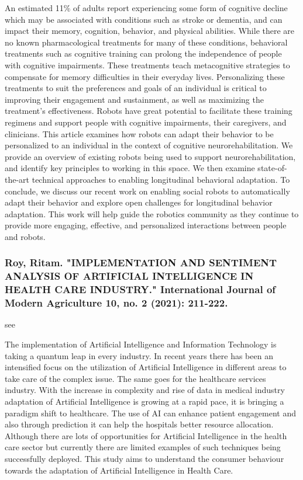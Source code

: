 \documentclass[conference]{IEEEtran}
\begin{document}
An estimated 11\% of adults report experiencing some form of cognitive decline which may be associated with conditions such as stroke or dementia, and can impact their memory, cognition, behavior, and physical abilities. While there are no known pharmacological treatments for many of these conditions, behavioral treatments such as cognitive training can prolong the independence of people with cognitive impairments. These treatments teach metacognitive strategies to compensate for memory difficulties in their everyday lives. Personalizing these treatments to suit the preferences and goals of an individual is critical to improving their engagement and sustainment, as well as maximizing the treatment’s effectiveness. Robots have great potential to facilitate these training regimens and support people with cognitive impairments, their caregivers, and clinicians. This article examines how robots can adapt their behavior to be personalized to an individual in the context of cognitive neurorehabilitation. We provide an overview of existing robots being used to support neurorehabilitation, and identify key principles to working in this space. We then examine state-of-the-art technical approaches to enabling longitudinal behavioral adaptation. To conclude, we discuss our recent work on enabling social robots to automatically adapt their behavior and explore open challenges for longitudinal behavior adaptation. This work will help guide the robotics community as they continue to provide more engaging, effective, and personalized interactions between people and robots.

\medskip
\subsubsection{Roy, Ritam. "IMPLEMENTATION AND SENTIMENT ANALYSIS OF ARTIFICIAL INTELLIGENCE IN HEALTH CARE INDUSTRY." International Journal of Modern Agriculture 10, no. 2 (2021): 211-222.}
see \cite{roy2021implementation}

The implementation of Artificial Intelligence and Information Technology is taking a quantum leap in every industry. In recent years there has been an intensified focus on the utilization of Artificial Intelligence in different areas to take care of the complex issue. The same goes for the healthcare services industry. With the increase in complexity and rise of data in medical industry adaptation of Artificial Intelligence is growing at a rapid pace, it is bringing a paradigm shift to healthcare. The use of AI can enhance patient engagement and also through prediction it can help the hospitals better resource allocation. Although there are lots of opportunities for Artificial Intelligence in the health care sector but currently there are limited examples of such techniques being successfully deployed. This study aims to understand the consumer behaviour towards the adaptation of Artificial Intelligence in Health Care.
\end{document}
